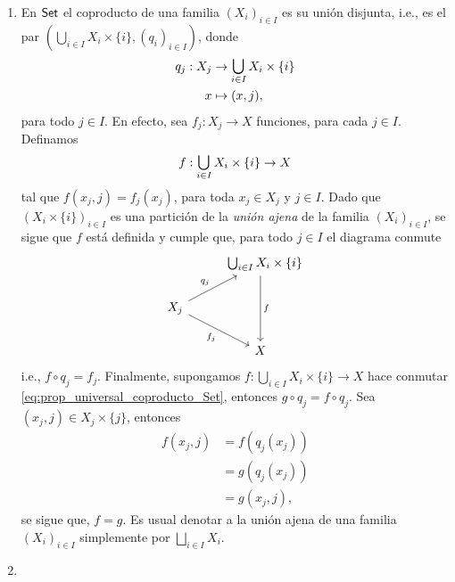 \begin{ejemplo}
    \begin{enumerate}[label=(\arabic*)]
        \item\label{item:ejemplo_1_coprod}
        En $\textsf{Set}$ el coproducto de una familia $(X_i)_{i\in I}$ es su unión disjunta, i.e., es el par 
        $(\bigcup_{i\in I} X_i\times \{i\},(q_i)_{i\in I})$, donde
        \begin{equation}
        \label{eq:q_j_coprod}
            \begin{split}
                q_j:X_j&\to\medcup_{i\in I} X_i\times \{i\}\\
                x & \mapsto (x,j),
            \end{split}
        \end{equation}
        para todo $j\in I$. En efecto, sea $f_j:X_j\to X$ funciones, para cada $j\in I$. Definamos 
        \begin{equation*}
            f:\medcup_{i\in I} X_i\times \{i\}\to X
        \end{equation*} 
        tal que $f(x_j,j)=f_j(x_j)$, para toda $x_j\in X_j$ y $j\in I$. Dado que $(X_i\times\{i\})_{i\in I}$ es una partición de la \textit{unión ajena} de la familia $(X_i)_{i\in I}$, se sigue que $f$ está definida y cumple que, para todo $j\in I$ el diagrama conmute
        \begin{equation}
        \label{eq:prop_universal_coproducto_Set}
\begin{tikzcd}[column sep=0.7cm]
 &
  \hspace{2.5mm}\bigcup_{i\in I} X_i\times \{i\} \arrow[dd,"f"] \\
    X_j\arrow[ur,"q_j"] \arrow[dr,"f_j"'] & \\
  & X
\end{tikzcd}
\end{equation}  
        i.e., $f\circ q_j=f_j$.
    Finalmente, supongamos $f:\bigcup_{i\in I} X_i\times \{i\}\to X$ hace conmutar \ref{eq:prop_universal_coproducto_Set}, entonces $g\circ q_j=f\circ q_j$. Sea $(x_j,j)\in X_j\times\{j\}$, entonces 
    \begin{align*}
        f(x_j,j)&=f(q_j(x_j))\\
        &=g(q_j(x_j))\\
        &=g(x_j,j),  
    \end{align*}
    se sigue que, $f=g$. Es usual denotar a la unión ajena de una familia $(X_i)_{i\in I}$ simplemente por $\bigsqcup_{i\in I} X_i$.
    \item[(2)] \label{item:prop_universal_coprod_Top}

\end{enumerate}
\end{ejemplo}
